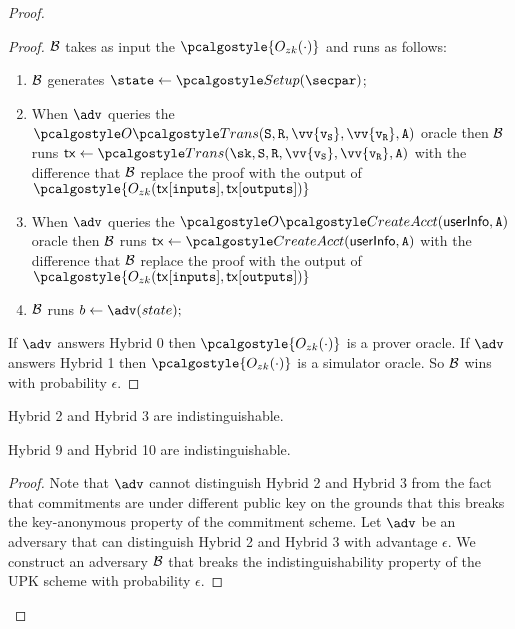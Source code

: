\begin{proof}
\begin{proof}
    $\mathcal{B}$ takes as input the $\pcalgostyle{O_{zk}(\cdot)}$ and runs as follows:
    \begin{enumerate}
        \item $\mathcal{B}$ generates $\state \gets \setup(\secpar)$;
        \item When $\adv$ queries the $\transOracle(\sset, \rset, \vv{\v_\sset}, \vv{\v_\rset}, \anset)$ oracle then $\mathcal{B}$ runs $\txn \gets \trans(\sk,\sset, \rset, \vv{\v_\sset}, \vv{\v_\rset}, \anset)$ with the difference that $\mathcal{B}$ replace the proof with the output of $\pcalgostyle{O_{zk}(\txn[\inputs], \txn[\outputs])}$
        \item When $\adv$ queries the $\createAcctOracle(\userinfo, \anset)$ oracle then $\mathcal{B}$ runs $\txn \gets \createAcct(\userinfo, \anset)$ with the difference that $\mathcal{B}$ replace the proof with the output of $\pcalgostyle{O_{zk}(\txn[\inputs], \txn[\outputs])}$
        \item $\mathcal{B}$ runs $b \gets \adv(state);$
    \end{enumerate}
    If $\adv$ answers Hybrid 0 then $\pcalgostyle{O_{zk}(\cdot)}$ is a prover oracle. If $\adv$ answers Hybrid 1 then $\pcalgostyle{O_{zk}(\cdot)}$ is a simulator oracle. So $\mathcal{B}$ wins with probability $\epsilon$.
\end{proof}

\begin{lemma}
    Hybrid 2 and Hybrid 3 are indistinguishable.
\end{lemma}
\begin{corollary}
    Hybrid 9 and Hybrid 10 are indistinguishable.
\end{corollary}

\begin{proof}
    Note that $\adv$ cannot distinguish Hybrid 2 and Hybrid 3 from the fact that commitments are under different public key on the grounds that this breaks the key-anonymous property of the commitment scheme.
    Let $\adv$ be an adversary that can distinguish Hybrid 2 and Hybrid 3 with advantage $\epsilon$. We construct an adversary $\mathcal{B}$ that breaks the indistinguishability property of the UPK scheme with probability $\epsilon$.


\end{proof}
\end{proof}
